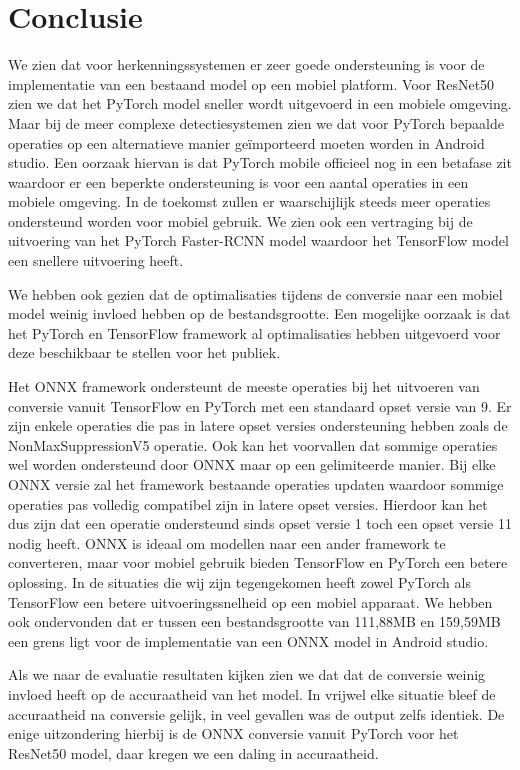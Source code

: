 \section{Conclusie}
We zien dat voor herkenningssystemen er zeer goede ondersteuning is voor de implementatie van een bestaand model op een mobiel platform.
Voor ResNet50 zien we dat het PyTorch model sneller wordt uitgevoerd in een mobiele omgeving.
Maar bij de meer complexe detectiesystemen zien we dat voor PyTorch bepaalde operaties op een alternatieve manier ge\"importeerd moeten worden in Android studio.
Een oorzaak hiervan is dat PyTorch mobile officieel nog in een betafase zit waardoor er een beperkte ondersteuning is voor een aantal operaties in een mobiele omgeving.
In de toekomst zullen er waarschijlijk steeds meer operaties ondersteund worden voor mobiel gebruik.
We zien ook een vertraging bij de uitvoering van het PyTorch Faster-RCNN model waardoor het TensorFlow model een snellere uitvoering heeft.

We hebben ook gezien dat de optimalisaties tijdens de conversie naar een mobiel model weinig invloed hebben op de bestandsgrootte.
Een mogelijke oorzaak is dat het PyTorch en TensorFlow framework al optimalisaties hebben uitgevoerd voor deze beschikbaar te stellen voor het publiek.

Het ONNX framework ondersteunt de meeste operaties bij het uitvoeren van conversie vanuit TensorFlow en PyTorch met een standaard opset versie van 9.
Er zijn enkele operaties die pas in latere opset versies ondersteuning hebben zoals de NonMaxSuppressionV5 operatie.
Ook kan het voorvallen dat sommige operaties wel worden ondersteund door ONNX maar op een gelimiteerde manier.
Bij elke ONNX versie zal het framework bestaande operaties updaten waardoor sommige operaties pas volledig compatibel zijn in latere opset versies.
Hierdoor kan het dus zijn dat een operatie ondersteund sinds opset versie 1 toch een opset versie 11 nodig heeft.
ONNX is ideaal om modellen naar een ander framework te converteren, maar voor mobiel gebruik bieden TensorFlow en PyTorch een betere oplossing.
In de situaties die wij zijn tegengekomen heeft zowel PyTorch als TensorFlow een betere uitvoeringssnelheid op een mobiel apparaat.
We hebben ook ondervonden dat er tussen een bestandsgrootte van 111,88MB en 159,59MB een grens ligt voor de implementatie van een ONNX model in Android studio.

Als we naar de evaluatie resultaten kijken zien we dat dat de conversie weinig invloed heeft op de accuraatheid van het model.
In vrijwel elke situatie bleef de accuraatheid na conversie gelijk, in veel gevallen was de output zelfs identiek.
De enige uitzondering hierbij is de ONNX conversie vanuit PyTorch voor het ResNet50 model, daar kregen we een daling in accuraatheid.

